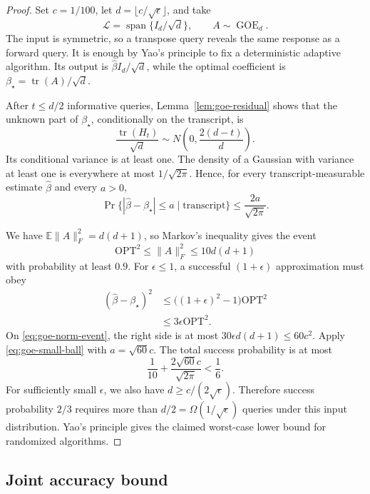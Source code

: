 \documentclass[twoside]{article}
\newcommand{\E}{\mathbb E}
\newcommand{\tr}{\operatorname{tr}}
\newcommand{\cL}{\mathcal L}
\newcommand{\OPT}{\mathrm{OPT}}
\begin{document}
\begin{proof}
Set $c=1/100$, let $d=\lfloor c/\sqrt\epsilon\rfloor$, and take
\[
 \cL=\operatorname{span}\{I_d/\sqrt d\},
 \qquad A\sim\operatorname{GOE}_d.
\]
The input is symmetric, so a transpose query reveals the same response as a
forward query. It is enough by Yao's principle to fix a deterministic
adaptive algorithm. Its output is $\widehat\beta I_d/\sqrt d$, while the
optimal coefficient is $\beta_\star=\tr(A)/\sqrt d$.

After $t\le d/2$ informative queries, Lemma~\ref{lem:goe-residual} shows that
the unknown part of $\beta_\star$, conditionally on the transcript, is
\[
 \frac{\tr(H_t)}{\sqrt d}\sim
 N\left(0,\frac{2(d-t)}d\right).
\]
Its conditional variance is at least one. The density of a Gaussian with
variance at least one is everywhere at most $1/\sqrt{2\pi}$. Hence, for every
transcript-measurable estimate $\widehat\beta$ and every $a>0$,
\begin{equation}
 \Pr\bigl\{|\widehat\beta-\beta_\star|\le a
       \mid\text{transcript}\bigr\}
 \le\frac{2a}{\sqrt{2\pi}}.
 \label{eq:goe-small-ball}
\end{equation}

We have $\E\|A\|_F^2=d(d+1)$, so Markov's inequality gives the event
\begin{equation}
 \OPT^2\le\|A\|_F^2\le10d(d+1)
 \label{eq:goe-norm-event}
\end{equation}
with probability at least $0.9$. For $\epsilon\le1$, a successful
$(1+\epsilon)$ approximation must obey
\begin{align*}
 (\widehat\beta-\beta_\star)^2
 &\le\bigl((1+\epsilon)^2-1\bigr)\OPT^2\\
 &\le3\epsilon\OPT^2.
\end{align*}
On \eqref{eq:goe-norm-event}, the right side is at most
$30\epsilon d(d+1)\le60c^2$. Apply \eqref{eq:goe-small-ball} with
$a=\sqrt{60}c$. The total success probability is at most
\[
 \frac1{10}+\frac{2\sqrt{60}c}{\sqrt{2\pi}}<\frac16.
\]
For sufficiently small $\epsilon$, we also have
$d\ge c/(2\sqrt\epsilon)$. Therefore success probability $2/3$ requires
more than $d/2=\Omega(1/\sqrt\epsilon)$ queries under this input
distribution. Yao's principle gives the claimed worst-case lower bound for
randomized algorithms.
\end{proof}

\subsection{Joint accuracy bound}
\end{document}
